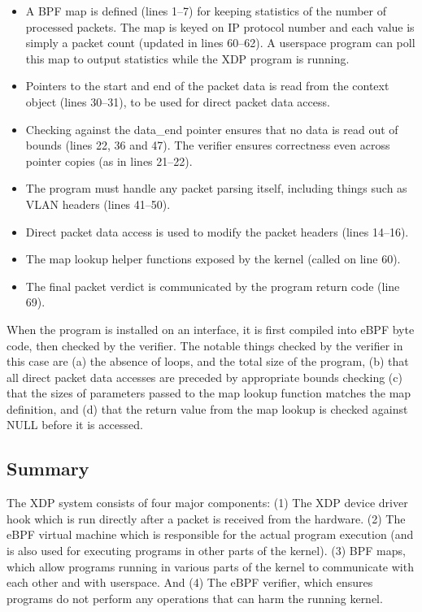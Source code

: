 \documentclass[sigconf]{acmart}
\begin{document}
\begin{itemize}
\item A BPF map is defined (lines 1--7) for keeping statistics of the number of
  processed packets. The map is keyed on IP protocol number and each value is
  simply a packet count (updated in lines 60--62). A userspace program can poll
  this map to output statistics while the XDP program is running.
\item Pointers to the start and end of the packet data is read from the context
  object (lines 30--31), to be used for direct packet data access.
\item Checking against the data\_end pointer ensures that no data is read out of
  bounds (lines 22, 36 and 47). The verifier ensures correctness even across
  pointer copies (as in lines 21--22).
\item The program must handle any packet parsing itself, including things such
  as VLAN headers (lines 41--50).
\item Direct packet data access is used to modify the packet headers (lines
  14--16).
\item The map lookup helper functions exposed by the kernel (called on line 60).
\item The final packet verdict is communicated by the program return code (line
  69).
\end{itemize}


When the program is installed on an interface, it is first compiled into eBPF
byte code, then checked by the verifier. The notable things checked by the
verifier in this case are (a) the absence of loops, and the total size of the
program, (b) that all direct packet data accesses are preceded by appropriate
bounds checking (c) that the sizes of parameters passed to the map lookup
function matches the map definition, and (d) that the return value from the map
lookup is checked against NULL before it is accessed.


\subsection{Summary}
\label{sec:design-summary}

The XDP system consists of four major components: (1) The XDP device driver hook
which is run directly after a packet is received from the hardware. (2) The eBPF
virtual machine which is responsible for the actual program execution (and is
also used for executing programs in other parts of the kernel). (3) BPF maps,
which allow programs running in various parts of the kernel to communicate with
each other and with userspace. And (4) The eBPF verifier, which ensures programs
do not perform any operations that can harm the running kernel.
\end{document}
